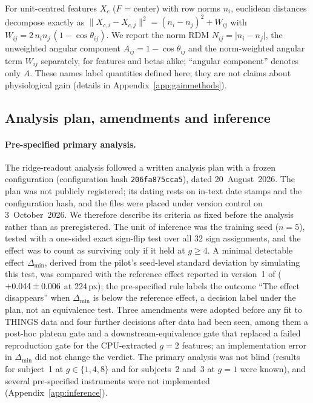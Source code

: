 For unit-centred features $X_c$ ($F$ = center) with row norms $n_i$, euclidean distances decompose
exactly as $\lVert X_{c,i} - X_{c,j} \rVert^2 = (n_i - n_j)^2 + W_{ij}$ with
$W_{ij} = 2\, n_i n_j \,(1 - \cos\theta_{ij})$. We report the norm RDM
$N_{ij} = \lvert n_i - n_j \rvert$, the unweighted angular component $A_{ij} = 1 - \cos\theta_{ij}$
and the norm-weighted angular term $W_{ij}$ separately, for features and betas alike; ``angular
component'' denotes only $A$. These names label quantities defined here; they are not claims about
physiological gain (details in Appendix~\ref{app:gainmethods}).

\subsection{Analysis plan, amendments and inference}
\label{sec:inference}

\paragraph{Pre-specified primary analysis.}
The ridge-readout analysis followed a written analysis plan with a frozen configuration
(configuration hash \texttt{206fa875cca5}), dated 20~August~2026. The plan was not publicly
registered; its dating rests on in-text date stamps and the configuration hash, and the files
were placed under version control on 3~October~2026. We therefore describe its criteria as fixed
before the analysis rather than as preregistered. The unit of inference was the training seed
($n = 5$), tested with a one-sided exact sign-flip test over all 32 sign assignments, and the
effect was to count as surviving only if it held at $g \geq 4$. A minimal detectable effect
$\Delta_{\min}$, derived from the pilot's seed-level standard deviation by simulating this test,
was compared with the reference effect reported in version~1 of \citet{evalres}
($+0.044 \pm 0.006$ at 224\,px); the pre-specified rule labels the
outcome ``The effect disappears'' when $\Delta_{\min}$ is below the reference effect, a decision
label under the plan, not an equivalence test. Three amendments were adopted before any fit to
THINGS data and four further decisions after data had been seen, among them a post-hoc plateau
gate and a downstream-equivalence gate that replaced a failed reproduction gate for the
CPU-extracted $g = 2$ features; an implementation error in $\Delta_{\min}$ did not change the
verdict. The primary analysis was not blind (results for subject~1 at $g \in \{1, 4, 8\}$ and for
subjects~2 and~3 at $g = 1$ were known), and several pre-specified instruments were not
implemented (Appendix~\ref{app:inference}).

